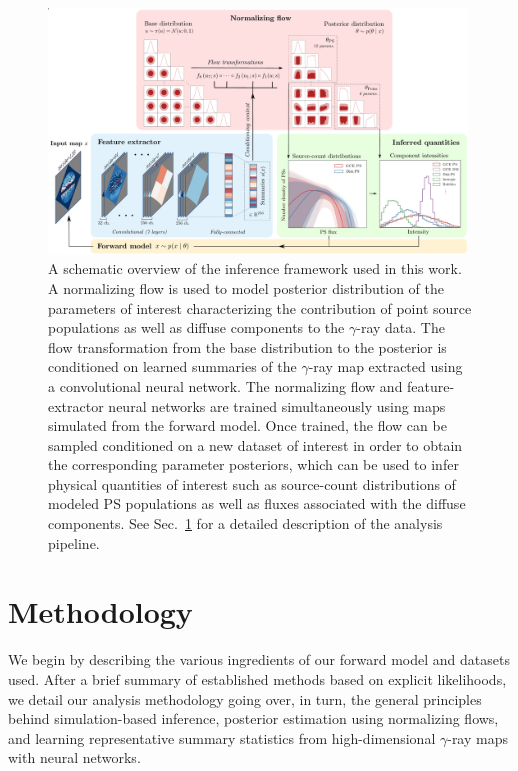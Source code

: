\documentclass[prd,aps,10pt,nofootinbib,twocolumn,superscriptaddress,preprintnumbers,balancelastpage,longbibliography]{revtex4-1}
\begin{document}
%
\begin{figure}
\centering
\includegraphics[width=0.99\textwidth]{plots/figure.pdf}
\caption{A schematic overview of the inference framework used in this work. A normalizing flow is used to model posterior distribution of the parameters of interest characterizing the contribution of point source populations as well as diffuse components to the $\gamma$-ray data. The flow transformation from the base distribution to the posterior is conditioned on learned summaries of the $\gamma$-ray map extracted using a convolutional neural network. The normalizing flow and feature-extractor neural networks are trained simultaneously using maps simulated from the forward model. Once trained, the flow can be sampled conditioned on a new dataset of interest in order to obtain the corresponding parameter posteriors, which can be used to infer physical quantities of interest such as source-count distributions of modeled PS populations as well as fluxes associated with the diffuse components. See Sec.~\ref{sec:analysis} for a detailed description of the analysis pipeline.}
\label{fig:figure}
\end{figure}
%

\section{Methodology}
\label{sec:analysis}

We begin by describing the various ingredients of our forward model and datasets used. After a brief summary of established methods based on explicit likelihoods, we detail our analysis methodology going over, in turn, the general principles behind simulation-based inference, posterior estimation using normalizing flows, and learning representative summary statistics from high-dimensional $\gamma$-ray maps with neural networks.
\end{document}
